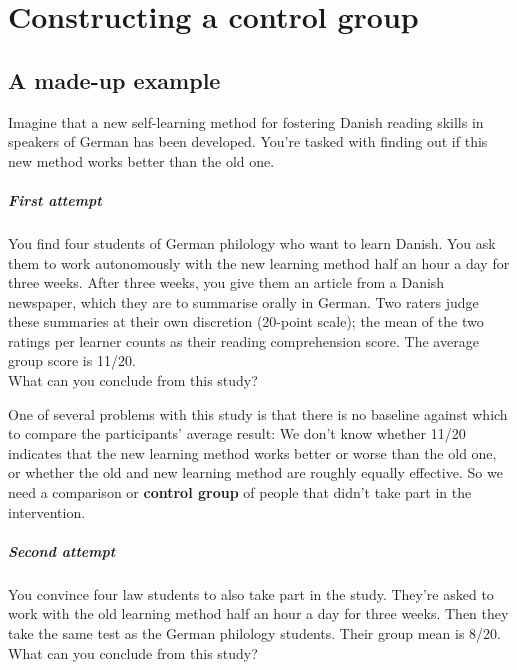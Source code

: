 \documentclass[a4paper]{tufte-book}\usepackage[]{graphicx}\usepackage[]{xcolor}
\newcommand{\term}[1]{\textbf{#1}}
\begin{document}
\chapter{Constructing a control group}\label{ch:randomisation}

\section{A made-up example}\label{sec:beispiel}
Imagine that a new self-learning method for fostering
Danish reading skills in speakers of German has been developed.
You're tasked with finding out if this new method works
better than the old one.

\paragraph{First attempt} 
You find four students of German philology
who want to learn Danish. You ask them to work
autonomously with the new learning method
half an hour a day for three weeks. After three weeks,
you give them an article from a Danish newspaper,
which they are to summarise orally in German.
Two raters judge these summaries at their own discretion
(20-point scale); the mean of the two ratings per
learner counts as their reading comprehension score.
The average group score is 11/20.\\
What can you conclude from this study?

\bigskip

One of several problems with this study is that 
there is no baseline against which to compare the participants'
average result: We don't know whether 11/20 indicates that the
new learning method works better or worse than the old one, or whether
the old and new learning method are roughly equally effective.
So we need a comparison or \term{control group}
of people that didn't take part in the intervention.

\paragraph{Second attempt}
You convince four law students to also take part in the study.
They're asked to work with the old learning method
half an hour a day for three weeks.
Then they take the same test as the German philology students.
Their group mean is 8/20.\\
What can you conclude from this study?

\clearpage
\end{document}
